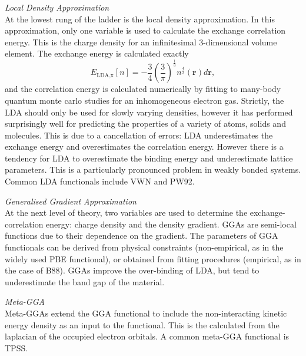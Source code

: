 \textit{Local Density Approximation} \\
At the lowest rung of the ladder is the local density approximation. In this approximation, only one variable is used to calculate the exchange correlation energy. This is the charge density for an infinitesimal 3-dimensional volume element. The exchange energy is calculated exactly
$$
E_{\textrm{LDA,x}}\left[n\right] = {-\frac{3}{4}\left(\frac{3}{\pi}\right)^{\frac{1}{3}}n^{\frac{4}{3}}\left(\textbf{r}\right)d\textbf{r}},
$$
and the correlation energy is calculated numerically by fitting to many-body quantum monte carlo studies for an inhomogeneous electron gas.%
Strictly, the LDA should only be used for slowly varying densities, however it has performed surprisingly well for predicting the properties of a variety of atoms, solids and molecules. This is due to a cancellation of errors: LDA underestimates the exchange energy and overestimates the correlation energy. However there is a tendency for LDA to overestimate the binding energy and underestimate lattice parameters. This is a particularly pronounced problem in weakly bonded systems. Common LDA functionals include VWN and PW92.

\textit{Generalised Gradient Approximation} \\
At the next level of theory, two variables are used to determine the exchange-correlation energy: charge density and the density gradient. GGAs are semi-local functions due to their dependence on the gradient. The parameters of GGA functionals can be derived from physical constraints (non-empirical, as in the widely used PBE functional), or obtained from fitting procedures (empirical, as in the case of B88). GGAs improve the over-binding of LDA, but tend to underestimate the band gap of the material.

\textit{Meta-GGA} \\
Meta-GGAs extend the GGA functional to include the non-interacting kinetic energy density as an input to the functional. This is the calculated from the laplacian of the occupied electron orbitals.
A common meta-GGA functional is TPSS.

